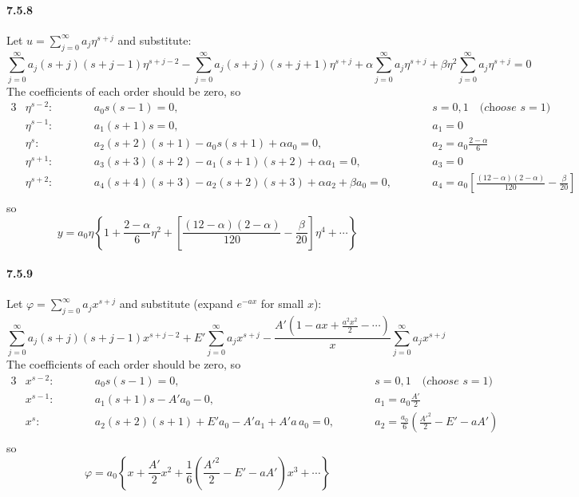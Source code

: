 \documentclass[a4paper]{article}
\begin{document}
\paragraph{7.5.8}
Let $u=\sum_{j=0}^\infty a_j\eta^{s+j}$ and substitute:
\[
\sum_{j=0}^\infty a_j(s+j)(s+j-1)\eta^{s+j-2}-\sum_{j=0}^\infty a_j(s+j)(s+j+1)\eta^{s+j}+\alpha\sum_{j=0}^\infty a_j\eta^{s+j}+\beta\eta^2\sum_{j=0}^\infty a_j\eta^{s+j}=0
\]
The coefficients of each order should be zero, so
\begin{alignat*}{3}
    & \eta^{s-2}:\qquad && a_0s(s-1)=0,\qquad && s=0,1\quad\textit{(choose $s=1$)}\\
    & \eta^{s-1}:\qquad && a_1(s+1)s=0,\qquad && a_1=0\\
    & \eta^{s}:\qquad && a_2(s+2)(s+1)-a_0s(s+1)+\alpha a_0=0,\qquad && a_2=a_0\frac{2-\alpha}{6}\\
    & \eta^{s+1}:\qquad && a_3(s+3)(s+2)-a_1(s+1)(s+2)+\alpha a_1=0,\qquad && a_3=0\\
    & \eta^{s+2}:\qquad && a_4(s+4)(s+3)-a_2(s+2)(s+3)+\alpha a_2+\beta a_0=0,\qquad && a_4=a_0\left[\frac{(12-\alpha)(2-\alpha)}{120}-\frac{\beta}{20}\right]\\
\end{alignat*}
so
\[
y=a_0\eta\left\{1+\frac{2-\alpha}{6}\eta^2+\left[\frac{(12-\alpha)(2-\alpha)}{120}-\frac{\beta}{20} \right]\eta^4+\cdots \right\}
\]

\paragraph{7.5.9}
Let $\varphi=\sum_{j=0}^\infty a_jx^{s+j}$ and substitute (expand $e^{-ax}$ for small $x$):
\[
\sum_{j=0}^\infty a_j(s+j)(s+j-1)x^{s+j-2}+E'\sum_{j=0}^\infty a_jx^{s+j}-\frac{A'(1-ax+\frac{a^2x^2}{2}-\cdots)}{x}\sum_{j=0}^\infty a_jx^{s+j}
\]
The coefficients of each order should be zero, so
\begin{alignat*}{3}
    & x^{s-2}:\qquad && a_0s(s-1)=0,\qquad && s=0,1\quad\textit{(choose $s=1$)}\\
    & x^{s-1}:\qquad && a_1(s+1)s-A'a_0-0,\qquad && a_1=a_0\frac{A'}{2}\\
    & x^{s}:\qquad && a_2(s+2)(s+1)+E'a_0-A'a_1+A'a\,a_0=0 ,\qquad && a_2=\frac{a_0}{6}(\frac{A'^2}{2}-E'-aA') \\
\end{alignat*}
so
\[
\varphi=a_0\left\{x+\frac{A'}{2}x^2+\frac{1}{6}(\frac{A'^2}{2}-E'-aA')x^3+\cdots \right\}
\]
\end{document}
